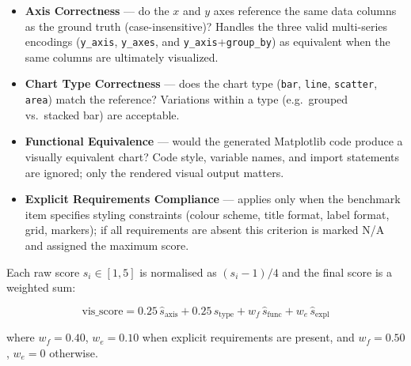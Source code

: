 \begin{itemize}
    \item \textbf{Axis Correctness} — do the $x$ and $y$ axes reference the same data
          columns as the ground truth (case-insensitive)? Handles the three valid
          multi-series encodings (\texttt{y\_axis}, \texttt{y\_axes}, and
          \texttt{y\_axis}+\texttt{group\_by}) as equivalent when the same columns
          are ultimately visualized.
    \item \textbf{Chart Type Correctness} — does the chart type (\texttt{bar},
          \texttt{line}, \texttt{scatter}, \texttt{area}) match the reference?
          Variations within a type (e.g.\ grouped vs.\ stacked bar) are acceptable.
    \item \textbf{Functional Equivalence} — would the generated Matplotlib code
          produce a visually equivalent chart? Code style, variable names, and import
          statements are ignored; only the rendered visual output matters.
    \item \textbf{Explicit Requirements Compliance} — applies only when the benchmark
          item specifies styling constraints (colour scheme, title format, label format,
          grid, markers); if all requirements are absent this criterion is marked N/A
          and assigned the maximum score.
\end{itemize}

\noindent Each raw score $s_i \in [1,5]$ is normalised as $(s_i - 1)/4$ and the
final score is a weighted sum:

\begin{equation}
    \text{vis\_score} = 0.25\,\hat{s}_{\text{axis}} + 0.25\,\hat{s}_{\text{type}}
                      + w_f\,\hat{s}_{\text{func}} + w_e\,\hat{s}_{\text{expl}}
    \label{eq:visscore}
\end{equation}

\noindent where $w_f = 0.40$, $w_e = 0.10$ when explicit requirements are present,
and $w_f = 0.50$, $w_e = 0$ otherwise.

